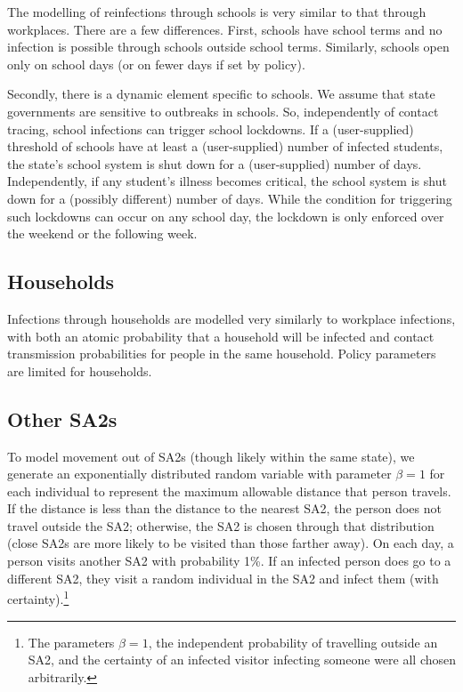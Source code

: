 \documentclass[submission]{grattan}
\begin{document}
The modelling of reinfections through schools is very similar to that through workplaces.
There are a few differences.
First, schools have school terms and no infection is possible through schools outside school terms.
Similarly, schools open only on school days (or on fewer days if set by policy).

Secondly, there is a dynamic element specific to schools.
We assume that state governments are sensitive to outbreaks in schools.
So, independently of contact tracing, school infections can trigger school lockdowns. 
If a (user-supplied) threshold of schools have at least a (user-supplied) number of
infected students, the state's school system is shut down for a (user-supplied) number of days.
Independently, if any student's illness becomes critical, the school system is shut down for
a (possibly different) number of days.  While the condition for triggering such lockdowns can occur
on any school day, the lockdown is only enforced over the weekend or the following week.


\subsection{Households}

Infections through households are modelled very similarly to workplace infections,
with both an atomic probability that a household will be infected and contact
transmission probabilities for people in the same household.
Policy parameters are limited for households.

\subsection{Other SA2s}

To model movement out of SA2s (though likely within the same state),
we generate an exponentially distributed random variable with parameter \(\beta = 1\)
for each individual to represent the maximum allowable distance that person
travels. If the distance is less than the distance to the nearest SA2, the person
does not travel outside the SA2; otherwise, the SA2 is chosen through that distribution
(close SA2s are more likely to be visited than those farther away).
On each day, a person visits another SA2 with probability 1\%.
If an infected person does go to a different SA2, they visit a random individual in the SA2 and
infect them (with certainty).\footnote{The parameters \(\beta = 1\), 
the independent probability of travelling outside an SA2, and the certainty of an infected visitor
infecting someone were all chosen arbitrarily.}
\end{document}
